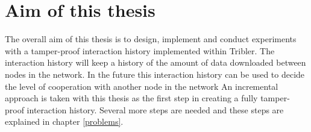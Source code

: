 \section{Aim of this thesis}
\label{pb-aim}
The overall aim of this thesis is to design, implement and conduct experiments with a tamper-proof interaction history
implemented within Tribler.
The interaction history will keep a history of the amount of data downloaded between nodes in the network.
In the future this interaction history can be used to decide the level of cooperation with another node in the network
An incremental approach is taken with this thesis as the first step in creating a fully tamper-proof interaction history.
Several more steps are needed and these steps are explained in chapter \ref{problems}.
